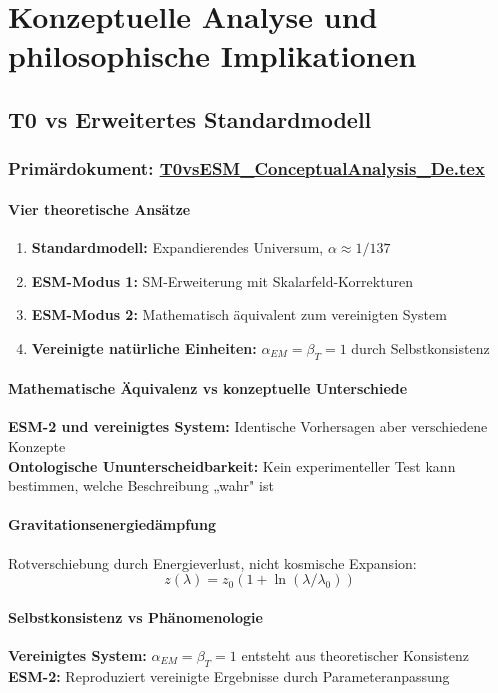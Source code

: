 \documentclass[12pt,a4paper]{report}
\begin{document}
	\chapter{Konzeptuelle Analyse und philosophische Implikationen}
	
	\section{T0 vs Erweitertes Standardmodell}
	\subsection{Primärdokument: \href{https://github.com/jpascher/T0-Time-Mass-Duality/tree/main/2/pdf/T0vsESM_ConceptualAnalysis_De.pdf}{T0vsESM\_ConceptualAnalysis\_De.tex}}
	
	\subsubsection{Vier theoretische Ansätze}
	\begin{enumerate}
		\item \textbf{Standardmodell:} Expandierendes Universum, $\alpha \approx 1/137$
		\item \textbf{ESM-Modus 1:} SM-Erweiterung mit Skalarfeld-Korrekturen
		\item \textbf{ESM-Modus 2:} Mathematisch äquivalent zum vereinigten System
		\item \textbf{Vereinigte natürliche Einheiten:} $\alpha_{EM} = \beta_T = 1$ durch Selbstkonsistenz
	\end{enumerate}
	
	\subsubsection{Mathematische Äquivalenz vs konzeptuelle Unterschiede}
	\textbf{ESM-2 und vereinigtes System:} Identische Vorhersagen aber verschiedene Konzepte\\
	\textbf{Ontologische Ununterscheidbarkeit:} Kein experimenteller Test kann bestimmen, welche 
	Beschreibung „wahr" ist
	
	\subsubsection{Gravitationsenergiedämpfung}
	Rotverschiebung durch Energieverlust, nicht kosmische Expansion:
	$$z(\lambda) = z_0(1 + \ln(\lambda/\lambda_0))$$
	
	\subsubsection{Selbstkonsistenz vs Phänomenologie}
	\textbf{Vereinigtes System:} $\alpha_{EM} = \beta_T = 1$ entsteht aus theoretischer Konsistenz\\
	\textbf{ESM-2:} Reproduziert vereinigte Ergebnisse durch Parameteranpassung
	
\end{document}
